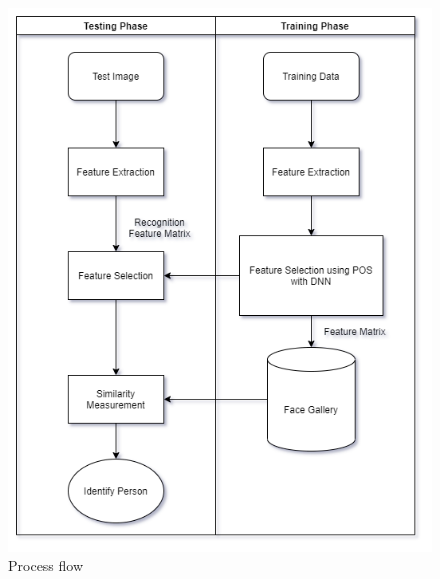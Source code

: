 \documentclass[a4paper,12pt]{report}
\begin{document}
\begin{figure}[h]
\center
 \includegraphics[width=1\textwidth]{images/mp_flowchart.png}
 \caption{Process flow}
\end{figure}



\end{document}
